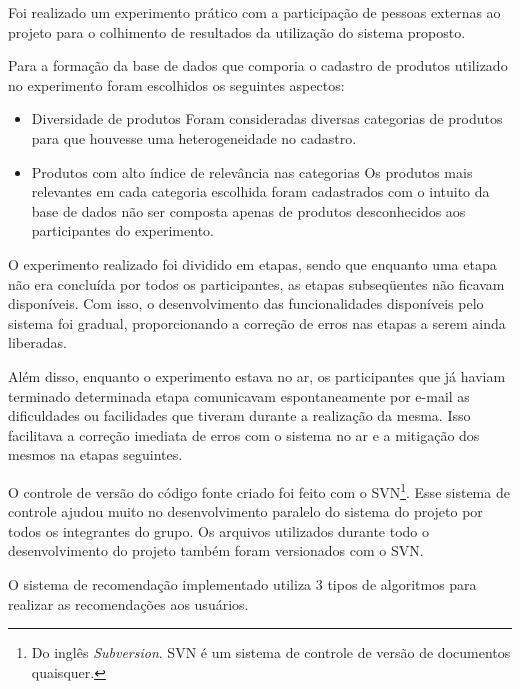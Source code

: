  Foi realizado um experimento prático com a participação de pessoas externas ao projeto para o colhimento de resultados da utilização do sistema proposto.

 Para a formação da base de dados que comporia o cadastro de produtos utilizado no experimento foram escolhidos os seguintes aspectos:

\begin{itemize}
	\item Diversidade de produtos
	\subitem Foram consideradas diversas categorias de produtos para que houvesse uma heterogeneidade no cadastro.
	\item Produtos com alto índice de relevância nas categorias
	\subitem Os produtos mais relevantes em cada categoria escolhida foram cadastrados com o intuito da base de dados não ser composta apenas de produtos desconhecidos aos participantes do experimento.
\end{itemize}

 O experimento realizado foi dividido em etapas, sendo que enquanto uma etapa não era concluída por todos os participantes, as etapas subseqüentes não ficavam disponíveis. Com isso, o desenvolvimento das funcionalidades disponíveis pelo sistema foi gradual, proporcionando a correção de erros nas etapas a serem ainda liberadas.

 Além disso, enquanto o experimento estava no ar, os participantes que já haviam terminado determinada etapa comunicavam espontaneamente por e-mail as dificuldades ou facilidades que tiveram durante a realização da mesma. Isso facilitava a correção imediata de erros com o sistema no ar e a mitigação dos mesmos na etapas seguintes.

 O controle de versão do código fonte criado foi feito com o SVN\footnote{Do inglês \textit{Subversion}. SVN é um sistema de controle de versão de documentos quaisquer.}. Esse sistema de controle ajudou muito no desenvolvimento paralelo do sistema do projeto por todos os integrantes do grupo. Os arquivos utilizados durante todo o desenvolvimento do projeto também foram versionados com o SVN.

 O sistema de recomendação implementado utiliza 3 tipos de algoritmos para realizar as recomendações aos usuários.

